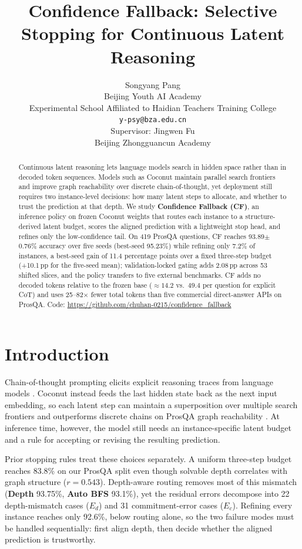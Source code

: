 \documentclass{article}
\title{Confidence Fallback: Selective Stopping for Continuous Latent Reasoning}
\author{Songyang Pang \\
Beijing Youth AI Academy \\
Experimental School Affiliated to Haidian Teachers Training College \\
\texttt{y-psy@bza.edu.cn} \\
Supervisor: Jingwen Fu \\
Beijing Zhongguancun Academy
}
\renewcommand{\headrulewidth}{0pt}%
\renewcommand{\headrulewidth}{0pt}%
\theoremstyle{compactthm}
\theoremstyle{compactdef}
\newcommand{\StructureD}{\textbf{Depth}}
\newcommand{\AutoRoute}{\textbf{Auto BFS}}
\begin{document}
\maketitle
\fancyhf{}\fancyfoot[C]{\thepage}\renewcommand{\headrulewidth}{0pt}%
\thispagestyle{plain}

\begin{abstract}
Continuous latent reasoning lets language models search in hidden space rather than in decoded token sequences. Models such as Coconut maintain parallel search frontiers and improve graph reachability over discrete chain-of-thought, yet deployment still requires two instance-level decisions: how many latent steps to allocate, and whether to trust the prediction at that depth. We study \textbf{Confidence Fallback (CF)}, an inference policy on frozen Coconut weights that routes each instance to a structure-derived latent budget, scores the aligned prediction with a lightweight stop head, and refines only the low-confidence tail. On 419 ProsQA questions, CF reaches 93.89$\pm$0.76\% accuracy over five seeds (best-seed 95.23\%) while refining only 7.2\% of instances, a best-seed gain of 11.4 percentage points over a fixed three-step budget (+10.1\,pp for the five-seed mean); validation-locked gating adds 2.08\,pp across 53 shifted slices, and the policy transfers to five external benchmarks. CF adds no decoded tokens relative to the frozen base (${\approx}14.2$ vs.\ $49.4$ per question for explicit CoT) and uses 25--82$\times$ fewer total tokens than five commercial direct-answer APIs on ProsQA. Code: \url{https://github.com/chuhan-0215/confidence_fallback}
\end{abstract}

\section{Introduction}
Chain-of-thought prompting elicits explicit reasoning traces from language models \citep{wei2022chain}. Coconut instead feeds the last hidden state back as the next input embedding, so each latent step can maintain a superposition over multiple search frontiers \citep{hao2024coconut,zhu2025superposition} and outperforms discrete chains on ProsQA graph reachability \citep{hao2024coconut}. At inference time, however, the model still needs an instance-specific latent budget and a rule for accepting or revising the resulting prediction.

Prior stopping rules treat these choices separately. A uniform three-step budget reaches 83.8\% on our ProsQA split even though solvable depth correlates with graph structure ($r{=}0.543$). Depth-aware routing removes most of this mismatch (\StructureD{} 93.75\%, \AutoRoute{} 93.1\%), yet the residual errors decompose into 22 depth-mismatch cases ($E_d$) and 31 commitment-error cases ($E_c$). Refining every instance reaches only 92.6\%, below routing alone, so the two failure modes must be handled sequentially: first align depth, then decide whether the aligned prediction is trustworthy.
\end{document}
